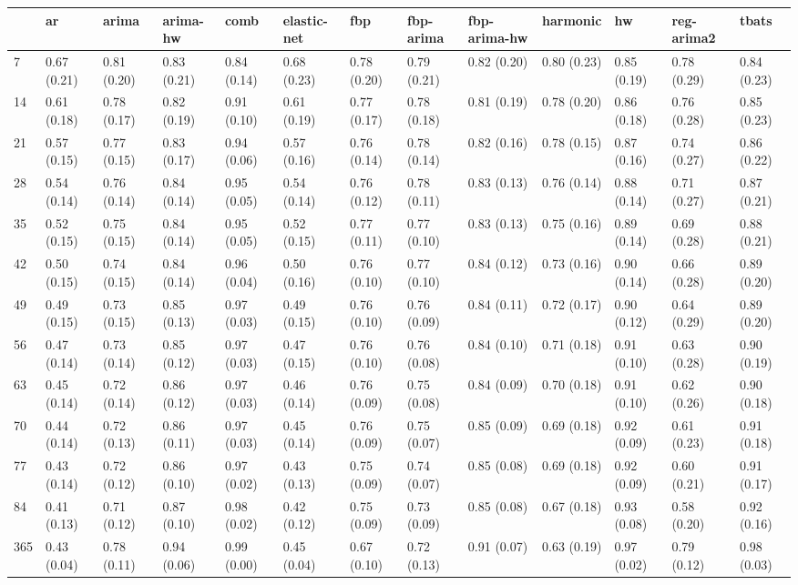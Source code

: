 \begin{tabular}{lllllllllllll}
\toprule
{} &           ar &        arima &     arima-hw &         comb &  elastic-net &          fbp &    fbp-arima & fbp-arima-hw &     harmonic &           hw &   reg-arima2 &        tbats \\
\midrule
7   &  0.67 (0.21) &  0.81 (0.20) &  0.83 (0.21) &  0.84 (0.14) &  0.68 (0.23) &  0.78 (0.20) &  0.79 (0.21) &  0.82 (0.20) &  0.80 (0.23) &  0.85 (0.19) &  0.78 (0.29) &  0.84 (0.23) \\
14  &  0.61 (0.18) &  0.78 (0.17) &  0.82 (0.19) &  0.91 (0.10) &  0.61 (0.19) &  0.77 (0.17) &  0.78 (0.18) &  0.81 (0.19) &  0.78 (0.20) &  0.86 (0.18) &  0.76 (0.28) &  0.85 (0.23) \\
21  &  0.57 (0.15) &  0.77 (0.15) &  0.83 (0.17) &  0.94 (0.06) &  0.57 (0.16) &  0.76 (0.14) &  0.78 (0.14) &  0.82 (0.16) &  0.78 (0.15) &  0.87 (0.16) &  0.74 (0.27) &  0.86 (0.22) \\
28  &  0.54 (0.14) &  0.76 (0.14) &  0.84 (0.14) &  0.95 (0.05) &  0.54 (0.14) &  0.76 (0.12) &  0.78 (0.11) &  0.83 (0.13) &  0.76 (0.14) &  0.88 (0.14) &  0.71 (0.27) &  0.87 (0.21) \\
35  &  0.52 (0.15) &  0.75 (0.15) &  0.84 (0.14) &  0.95 (0.05) &  0.52 (0.15) &  0.77 (0.11) &  0.77 (0.10) &  0.83 (0.13) &  0.75 (0.16) &  0.89 (0.14) &  0.69 (0.28) &  0.88 (0.21) \\
42  &  0.50 (0.15) &  0.74 (0.15) &  0.84 (0.14) &  0.96 (0.04) &  0.50 (0.16) &  0.76 (0.10) &  0.77 (0.10) &  0.84 (0.12) &  0.73 (0.16) &  0.90 (0.14) &  0.66 (0.28) &  0.89 (0.20) \\
49  &  0.49 (0.15) &  0.73 (0.15) &  0.85 (0.13) &  0.97 (0.03) &  0.49 (0.15) &  0.76 (0.10) &  0.76 (0.09) &  0.84 (0.11) &  0.72 (0.17) &  0.90 (0.12) &  0.64 (0.29) &  0.89 (0.20) \\
56  &  0.47 (0.14) &  0.73 (0.14) &  0.85 (0.12) &  0.97 (0.03) &  0.47 (0.15) &  0.76 (0.10) &  0.76 (0.08) &  0.84 (0.10) &  0.71 (0.18) &  0.91 (0.10) &  0.63 (0.28) &  0.90 (0.19) \\
63  &  0.45 (0.14) &  0.72 (0.14) &  0.86 (0.12) &  0.97 (0.03) &  0.46 (0.14) &  0.76 (0.09) &  0.75 (0.08) &  0.84 (0.09) &  0.70 (0.18) &  0.91 (0.10) &  0.62 (0.26) &  0.90 (0.18) \\
70  &  0.44 (0.14) &  0.72 (0.13) &  0.86 (0.11) &  0.97 (0.03) &  0.45 (0.14) &  0.76 (0.09) &  0.75 (0.07) &  0.85 (0.09) &  0.69 (0.18) &  0.92 (0.09) &  0.61 (0.23) &  0.91 (0.18) \\
77  &  0.43 (0.14) &  0.72 (0.12) &  0.86 (0.10) &  0.97 (0.02) &  0.43 (0.13) &  0.75 (0.09) &  0.74 (0.07) &  0.85 (0.08) &  0.69 (0.18) &  0.92 (0.09) &  0.60 (0.21) &  0.91 (0.17) \\
84  &  0.41 (0.13) &  0.71 (0.12) &  0.87 (0.10) &  0.98 (0.02) &  0.42 (0.12) &  0.75 (0.09) &  0.73 (0.09) &  0.85 (0.08) &  0.67 (0.18) &  0.93 (0.08) &  0.58 (0.20) &  0.92 (0.16) \\
365 &  0.43 (0.04) &  0.78 (0.11) &  0.94 (0.06) &  0.99 (0.00) &  0.45 (0.04) &  0.67 (0.10) &  0.72 (0.13) &  0.91 (0.07) &  0.63 (0.19) &  0.97 (0.02) &  0.79 (0.12) &  0.98 (0.03) \\
\bottomrule
\end{tabular}
